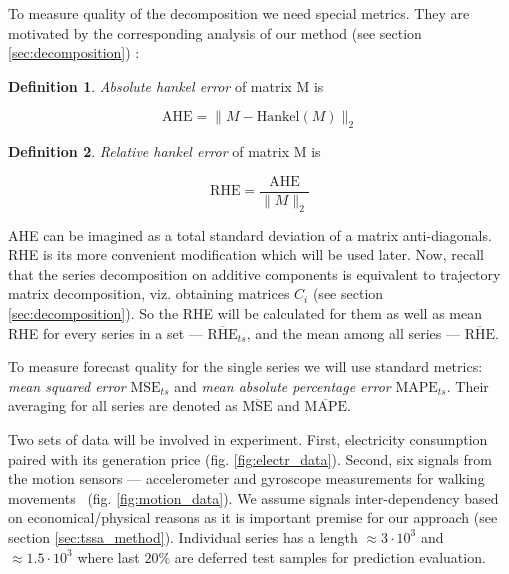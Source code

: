 \documentclass[referee, pdflatex, sn-mathphys-num]{sn-jnl}
\theoremstyle{definition}
\newtheorem*{Def}{Definition}
\theoremstyle{plain}
\begin{document}
	To measure quality of the decomposition we need special metrics. They are motivated by the corresponding analysis of our method (see section \ref{sec:decomposition}) :
	
	\begin{Def}
		\emph{Absolute hankel error} of matrix M is 
		
		\[
		\text{AHE} = \lVert M - \text{Hankel}(M) \rVert_2
		\] 
		
	\end{Def}	
	
	\begin{Def}		
		
		\emph{Relative hankel error} of matrix M is 
		
		\[
		\text{RHE} = \frac{\text{AHE}}{\lVert M \rVert_2} 
		\] 		
		
	\end{Def}
	
	AHE can be imagined as a total standard deviation of a matrix anti-diagonals. RHE is its more convenient modification which will be used later.	Now, recall that the series decomposition on additive components is equivalent to trajectory matrix decomposition, viz. obtaining matrices $ C_i $ (see section \ref{sec:decomposition}). So the RHE will be calculated for them as well as mean RHE for every series in a set --- $ \overline{\text{RHE}}_{ts} $, and the mean among all series --- $ \overline{\text{RHE}} $. 
	
	To measure forecast quality for the single series we will use standard metrics: \emph{mean squared error} $ \text{MSE}_{ts} $ and \emph{mean absolute percentage error} $ \text{MAPE}_{ts} $. Their averaging for all series are denoted as $ \overline{\text{MSE}} $ and $ \overline{\text{MAPE}} $.
	
	Two sets of data will be involved in experiment. First, electricity consumption paired with its generation price (fig. \ref{fig:electr_data}). Second, six signals from the motion sensors --- accelerometer and gyroscope measurements for walking movements~\cite{accelerometryData} (fig. \ref{fig:motion_data}). We assume signals inter-dependency based on economical/physical reasons as it is important premise for our approach (see section \ref{sec:tssa_method}). Individual series has a length $ \approx 3 \cdot 10^3 $  and $ \approx 1.5 \cdot 10^3 $ where last $ 20\% $ are deferred test samples for prediction evaluation.
	
\end{document}
